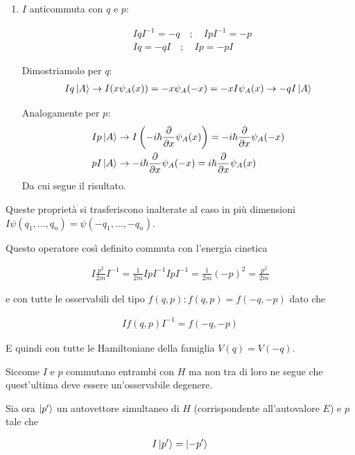 \begin{enumerate}
	\item  $I$ anticommuta con $q$ e $p$:
	
	\begin{align}
	{}&IqI^{-1}= -q \quad ; \quad IpI^{-1} = -p \\
	&Iq= -qI \quad ; \quad Ip= -pI
	\end{align}
	
	Dimostriamolo per $q$:
	\begin{align}
	Iq\ket{A} \rightarrow I(x\psi_A(x))= -x \psi_A(-x)= -xI\psi_A(x) \rightarrow-qI\ket{A}  
	\end{align}	

	Analogamente per $p$:
	\begin{align}
	{}& Ip\ket{A} \rightarrow I \left(-i\hbar \frac{\partial}{\partial x}\psi_A(x)	\right)= -i\hbar \frac{\partial}{\partial x}\psi_A(-x) 	\\
	& pI \ket{A}  \rightarrow -i\hbar \frac{\partial}{\partial x}\psi_A(-x)= i\hbar \frac{\partial}{\partial x}\psi_A(x) 
	\end{align}
	Da cui segue il risultato.

\end{enumerate}

Queste proprietà si trasferiscono inalterate al caso in più dimensioni $I\psi(q_1, ..., q_n)= \psi(-q_1,...,-q_n)$.

Questo operatore così definito commuta con l'energia cinetica 

\begin{align}
I\frac{p^2}{2m}I^{-1} = \frac{1}{2m} IpI^{-1}IpI^{-1}= \frac{1}{2m} (-p)^2= \frac{p^2}{2m}
\end{align}


e con tutte le osservabili del tipo $f(q,p) : f(q,p)=f(-q,-p)$ dato che

\begin{align}
If(q,p)I^{-1}=f(-q,-p)
\end{align}

E quindi con tutte le Hamiltoniane della famiglia $V(q)= V(-q)$.

\bigskip

Siccome $I$ e $p$ commutano entrambi con $H$ ma non tra di loro ne segue che quest'ultima deve essere un'osservabile degenere.


Sia ora $\ket{p'}$ un autovettore simultaneo di $H$ (corrispondente all'autovalore $E$) e $p$ tale che

\begin{align}
I\ket{p'} = \ket{-p'}
\end{align}

